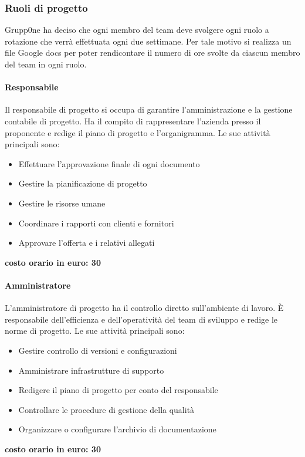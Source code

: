 \documentclass[../norme-di-progetto.tex]{subfiles}
\begin{document}
\subsubsection{Ruoli di progetto}
\label{subs:ruoli di progetto}
Grupp0ne ha deciso che ogni membro del team deve svolgere ogni ruolo a rotazione che verrà effettuata ogni due settimane. Per tale motivo si realizza un file Google docs per poter rendicontare il numero di ore svolte da ciascun membro del team in ogni ruolo.
\paragraph{Responsabile}
\label{par:responsabile}
 Il responsabile di progetto si occupa di garantire l'amministrazione e la gestione contabile di progetto. Ha il compito di rappresentare l'azienda presso il proponente e redige il piano di progetto e l'organigramma. Le sue attività principali sono:
\begin{itemize}
	\item Effettuare l'approvazione finale di ogni documento
	\item Gestire la pianificazione di progetto
	\item Gestire le risorse umane
	\item Coordinare i rapporti con clienti e fornitori 
	\item Approvare l'offerta e i relativi allegati
\end{itemize}
\textbf{costo orario in euro: 30}
\paragraph{Amministratore}
\label{par:amministratore}
L'amministratore di progetto ha il controllo diretto sull'ambiente di lavoro. È responsabile dell'efficienza e dell'operatività del team di sviluppo e redige le norme di progetto. Le sue attività principali sono:
\begin{itemize}
	\item Gestire controllo di versioni e configurazioni
	\item Amministrare infrastrutture di supporto
	\item Redigere il piano di progetto per conto del responsabile
	\item Controllare le procedure di gestione della qualità
	\item Organizzare o configurare l'archivio di documentazione
\end{itemize}
\textbf{costo orario in euro: 30}
\end{document}

